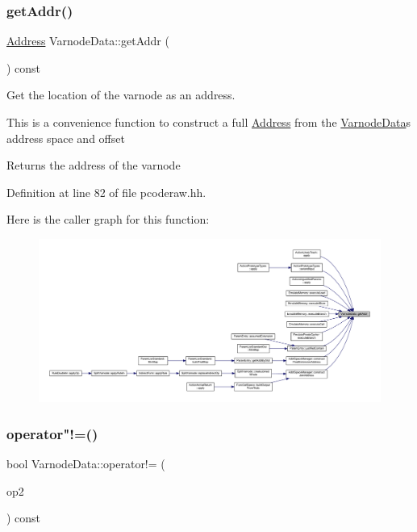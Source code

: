 \subsubsection{\texorpdfstring{getAddr()}{getAddr()}}
{\footnotesize\ttfamily \mbox{\hyperlink{class_address}{Address}} Varnode\+Data\+::get\+Addr (\begin{DoxyParamCaption}\item[{void}]{ }\end{DoxyParamCaption}) const\hspace{0.3cm}{\ttfamily [inline]}}



Get the location of the varnode as an address. 

This is a convenience function to construct a full \mbox{\hyperlink{class_address}{Address}} from the \mbox{\hyperlink{struct_varnode_data}{Varnode\+Data}}\textquotesingle{}s address space and offset \begin{DoxyReturn}{Returns}
the address of the varnode 
\end{DoxyReturn}


Definition at line 82 of file pcoderaw.\+hh.

Here is the caller graph for this function\+:
\nopagebreak
\begin{figure}[H]
\begin{center}
\leavevmode
\includegraphics[width=350pt]{struct_varnode_data_a815490509cf832fbb9dc45214dd33c8e_icgraph}
\end{center}
\end{figure}
\mbox{\label{struct_varnode_data_ad28f091080d837492b6397457a77142d}} 
\subsubsection{\texorpdfstring{operator"!=()}{operator!=()}}
{\footnotesize\ttfamily bool Varnode\+Data\+::operator!= (\begin{DoxyParamCaption}\item[{const \mbox{\hyperlink{struct_varnode_data}{Varnode\+Data}} \&}]{op2 }\end{DoxyParamCaption}) const\hspace{0.3cm}{\ttfamily [inline]}}




